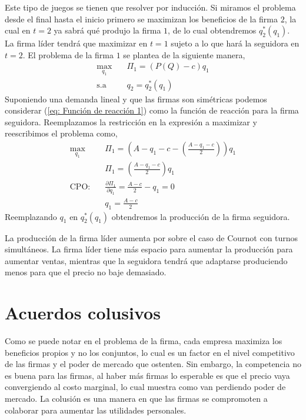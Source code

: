 Este tipo de juegos se tienen que resolver por inducción. Si miramos el problema desde el final hasta el inicio primero se maximizan los beneficios de la firma $2$, la cual en $t = 2$ ya sabrá qué produjo la firma $1$, de lo cual obtendremos $q_2^*(q_1)$. La firma líder tendrá que maximizar en $t=1$ sujeto a lo que hará la seguidora en $t=2$. El problema de la firma $1$ se plantea de la siguiente manera,
\begin{align*}
    \max_{q_1} \quad &\Pi_1 = (P(Q)-c)q_1 \\
    \text{s.a}\quad &q_2=q_2^*(q_1)
\end{align*}
Suponiendo una demanda lineal y que las firmas son simétricas podemos considerar (\ref{eq: Función de reacción 1}) como la función de reacción para la firma seguidora. Reemplazamos la restricción en la expresión a maximizar y reescribimos el problema como,
\begin{align*}
    \max_{q_1} \quad &\Pi_1 = \left(A-q_1-c- \left(\frac{A-q_1-c}{2} \right) \right)q_1 \\ & \Pi_1 = \left( \frac{A-q_1-c}{2}   \right)q_1 \\
    \text{CPO:} \quad & \frac{\partial \Pi_1}{\partial q_1} =   \frac{A-c}{2} -q_1 = 0 \\
    & q_1 = \frac{A-c}{2}
\end{align*}
Reemplazando $q_1$ en $q_2^*(q_1)$ obtendremos la producción de la firma seguidora. 

La producción de la firma líder aumenta por sobre el caso de Cournot con turnos simultáneos. La firma líder tiene más espacio para aumentar la producción para aumentar ventas, mientras que la seguidora tendrá que adaptarse produciendo menos para que el precio no baje demasiado.


\section{Acuerdos colusivos}

Como se puede notar en el problema de la firma, cada empresa maximiza los beneficios propios y no los conjuntos, lo cual es un factor en el nivel competitivo de las firmas y el poder de mercado que ostenten. Sin embargo, la competencia no es buena para las firmas, al haber más firmas lo esperable es que el precio vaya convergiendo al costo marginal, lo cual muestra como van perdiendo poder de mercado. La colusión es una manera en que las firmas se compromoten a colaborar para aumentar las utilidades personales. 


